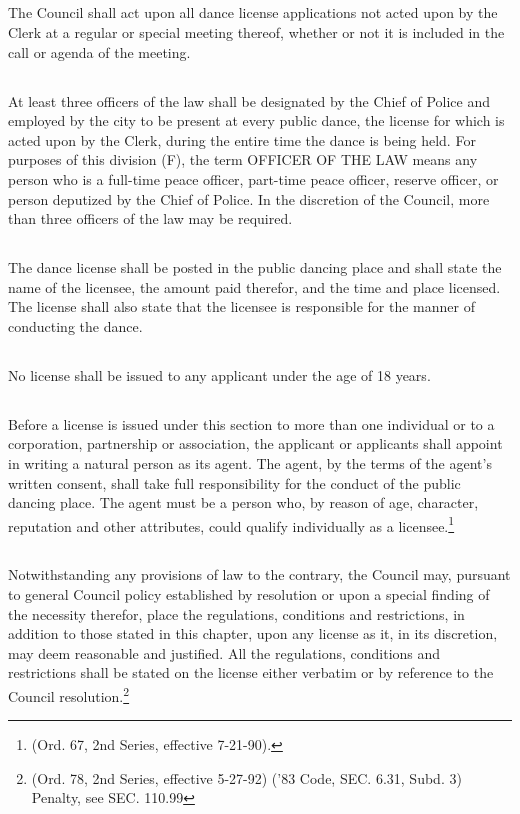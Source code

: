 \subsection{}
The Council shall act upon all dance license applications not acted upon by the Clerk at a regular or special meeting thereof, whether or not it is included in the call or agenda of the meeting.
\subsection{}
At least three officers of the law shall be designated by the Chief of Police and employed by the city to be present at every public dance, the license for which is acted upon by the Clerk, during the entire time the dance is being held.  For purposes of this division (F), the term OFFICER OF THE LAW means any person who is a full-time peace officer, part-time peace officer, reserve officer, or person deputized by the Chief of Police.  In the discretion of the Council, more than three officers of the law may be required.
\subsection{}
The dance license shall be posted in the public dancing place and shall state the name of the licensee, the amount paid therefor, and the time and place licensed.  The license shall also state that the licensee is responsible for the manner of conducting the dance.
\subsection{}
No license shall be issued to any applicant under the age of 18 years.
\subsection{}
Before a license is issued under this section to more than one individual or to a corporation, partnership or association, the applicant or applicants shall appoint in writing a natural person as its agent.  The agent, by the terms of the agent’s written consent, shall take full responsibility for the conduct of the public dancing place.  The agent must be a person who, by reason of age, character, reputation and other attributes, could qualify individually as a licensee.\footnote{(Ord. 67, 2nd Series, effective 7-21-90).}
\subsection{}
Notwithstanding any provisions of law to the contrary, the Council may, pursuant to general Council policy established by resolution or upon a special finding of the necessity therefor, place the regulations, conditions and restrictions, in addition to those stated in this chapter, upon any license as it, in its discretion, may deem reasonable and justified.  All the regulations, conditions and restrictions shall be stated on the license either verbatim or by reference to the Council resolution.\footnote{(Ord. 78, 2nd Series, effective 5-27-92) (’83 Code, SEC. 6.31, Subd. 3)  Penalty, see SEC. 110.99}\\

